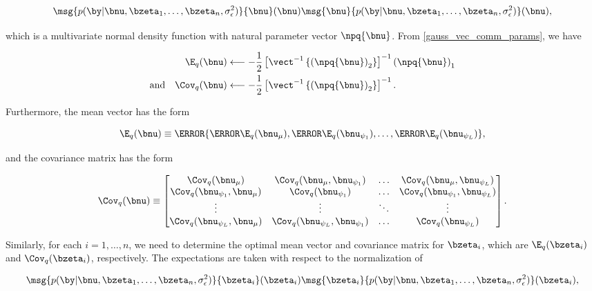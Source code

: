 \documentclass[12pt]{article}
\def\sigsqeps{\sigma^2_{\epsilon}}
\def\numu{\bnu_\mu}
\newcommand\nupsi[1]{\bnu_{\psi_{#1}}}
\theoremstyle{plain}
\theoremstyle{definition}
\theoremstyle{remark}
\begin{document}
\[
	\msg{p (\by | \bnu, \bzeta_1, \dots, \bzeta_n, \sigsqeps)}{\bnu} (\bnu)
	\msg{\bnu}{p (\by | \bnu, \bzeta_1, \dots, \bzeta_n, \sigsqeps)} (\bnu),
\]

\noindent which is a multivariate normal density function with natural parameter vector $\npq{\bnu}$.
From \eqref{gauss_vec_comm_params}, we have

\begin{align}
\begin{split}
	\E_q (\bnu)
		&\longleftarrow
			-\frac12 \left[
				\vect^{-1} \left\{
					\left( \npq{\bnu} \right)_2
				\right\}
			\right]^{-1} \left( \npq{\bnu} \right)_1 \\
	\text{and} \quad
	\Cov_q (\bnu)
		&\longleftarrow
			-\frac12 \left[
				\vect^{-1} \left\{
					\left( \npq{\bnu} \right)_2
				\right\}
			\right]^{-1}.
\end{split}
\label{mom_lik_nu}
\end{align}

\noindent Furthermore, the mean vector has the form

\begin{equation}
	\E_q (\bnu) \equiv \T{
		\left\{ \T{\E_q (\numu)}, \T{\E_q (\nupsi{1})}, \dots, \T{\E_q (\nupsi{L})} \right\}
	},
\label{exp_lik_nu}
\end{equation}

\noindent and the covariance matrix has the form

\begin{equation}
	\Cov_q (\bnu) \equiv \begin{bmatrix}
		\Cov_q (\numu) & \Cov_q (\numu, \nupsi{1}) & \dots & \Cov_q (\numu, \nupsi{L}) \\
		\Cov_q (\nupsi{1}, \numu) & \Cov_q (\nupsi{1}) & \dots & \Cov_q (\nupsi{1}, \nupsi{L}) \\
		\vdots & \vdots & \ddots & \vdots \\
		\Cov_q (\nupsi{L}, \numu) & \Cov_q (\nupsi{L}, \nupsi{1}) & \dots & \Cov_q (\nupsi{L}) \\
	\end{bmatrix}.
\label{cov_lik_nu}
\end{equation}

\noindent Similarly, for each $i = 1, \dots, n$, we need to determine the optimal mean vector and covariance matrix
for $\bzeta_i$, which are $\E_q (\bzeta_i)$ and $\Cov_q (\bzeta_i)$, respectively. The expectations are taken with
respect to the normalization of

\[
	\msg{p (\by | \bnu, \bzeta_1, \dots, \bzeta_n, \sigsqeps)}{\bzeta_i} (\bzeta_i)
	\msg{\bzeta_i}{p (\by | \bnu, \bzeta_1, \dots, \bzeta_n, \sigsqeps)} (\bzeta_i),
\]
\end{document}
